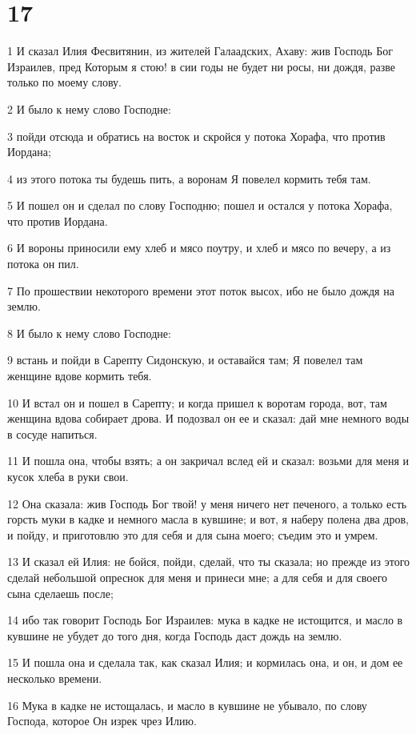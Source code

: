 \chapter{17}

\par 1 И сказал Илия Фесвитянин, из жителей Галаадских, Ахаву: жив Господь Бог Израилев, пред Которым я стою! в сии годы не будет ни росы, ни дождя, разве только по моему слову.
\par 2 И было к нему слово Господне:
\par 3 пойди отсюда и обратись на восток и скройся у потока Хорафа, что против Иордана;
\par 4 из этого потока ты будешь пить, а воронам Я повелел кормить тебя там.
\par 5 И пошел он и сделал по слову Господню; пошел и остался у потока Хорафа, что против Иордана.
\par 6 И вороны приносили ему хлеб и мясо поутру, и хлеб и мясо по вечеру, а из потока он пил.
\par 7 По прошествии некоторого времени этот поток высох, ибо не было дождя на землю.
\par 8 И было к нему слово Господне:
\par 9 встань и пойди в Сарепту Сидонскую, и оставайся там; Я повелел там женщине вдове кормить тебя.
\par 10 И встал он и пошел в Сарепту; и когда пришел к воротам города, вот, там женщина вдова собирает дрова. И подозвал он ее и сказал: дай мне немного воды в сосуде напиться.
\par 11 И пошла она, чтобы взять; а он закричал вслед ей и сказал: возьми для меня и кусок хлеба в руки свои.
\par 12 Она сказала: жив Господь Бог твой! у меня ничего нет печеного, а только есть горсть муки в кадке и немного масла в кувшине; и вот, я наберу полена два дров, и пойду, и приготовлю это для себя и для сына моего; съедим это и умрем.
\par 13 И сказал ей Илия: не бойся, пойди, сделай, что ты сказала; но прежде из этого сделай небольшой опреснок для меня и принеси мне; а для себя и для своего сына сделаешь после;
\par 14 ибо так говорит Господь Бог Израилев: мука в кадке не истощится, и масло в кувшине не убудет до того дня, когда Господь даст дождь на землю.
\par 15 И пошла она и сделала так, как сказал Илия; и кормилась она, и он, и дом ее несколько времени.
\par 16 Мука в кадке не истощалась, и масло в кувшине не убывало, по слову Господа, которое Он изрек чрез Илию.
